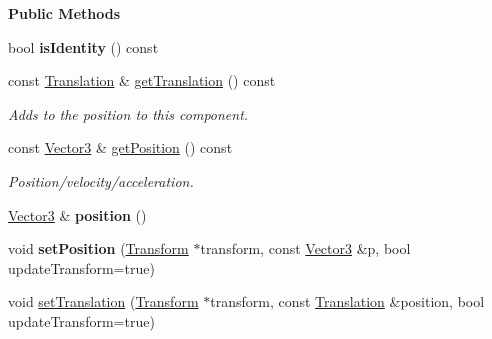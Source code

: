 \begin{Indent}\textbf{ Public Methods}\par
\begin{DoxyCompactItemize}
\item 
\mbox{\label{classrev_1_1_translation_component_af3808fef2f56557818262cef896e199c}} 
bool {\bfseries is\+Identity} () const
\item 
const \mbox{\hyperlink{structrev_1_1_translation}{Translation}} \& \mbox{\hyperlink{classrev_1_1_translation_component_a3447ac0f8cbe55e414c97736d06b44ea}{get\+Translation}} () const
\begin{DoxyCompactList}\small\item\em Adds to the position to this component. \end{DoxyCompactList}\item 
\mbox{\label{classrev_1_1_translation_component_aa9e557d81c50cd6a698fb6b81f551c2f}} 
const \mbox{\hyperlink{classrev_1_1_vector}{Vector3}} \& \mbox{\hyperlink{classrev_1_1_translation_component_aa9e557d81c50cd6a698fb6b81f551c2f}{get\+Position}} () const
\begin{DoxyCompactList}\small\item\em Position/velocity/acceleration. \end{DoxyCompactList}\item 
\mbox{\label{classrev_1_1_translation_component_a6fa2f68ebea076c8643611047d22c2f7}} 
\mbox{\hyperlink{classrev_1_1_vector}{Vector3}} \& {\bfseries position} ()
\item 
\mbox{\label{classrev_1_1_translation_component_ad84e611b67ae17ac4919634aa560bc7d}} 
void {\bfseries set\+Position} (\mbox{\hyperlink{classrev_1_1_transform}{Transform}} $\ast$transform, const \mbox{\hyperlink{classrev_1_1_vector}{Vector3}} \&p, bool update\+Transform=true)
\item 
\mbox{\label{classrev_1_1_translation_component_ac6d1fe7e1759c4d4c7475889b1c9c671}} 
void \mbox{\hyperlink{classrev_1_1_translation_component_ac6d1fe7e1759c4d4c7475889b1c9c671}{set\+Translation}} (\mbox{\hyperlink{classrev_1_1_transform}{Transform}} $\ast$transform, const \mbox{\hyperlink{structrev_1_1_translation}{Translation}} \&position, bool update\+Transform=true)

\end{DoxyCompactItemize}
\end{Indent}
